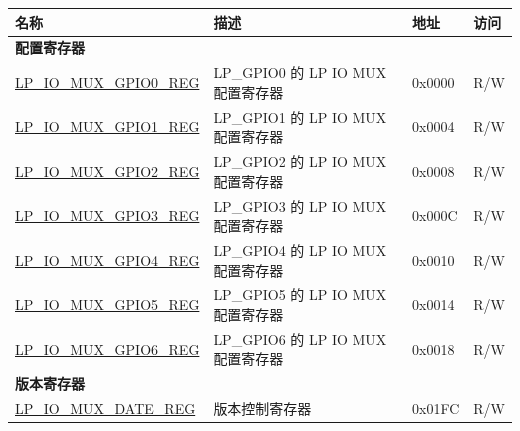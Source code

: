 \begin{longtable}{ | p{6cm} | p{7.2cm} | p{1.3cm} | p{1cm} | }
\hline\rowcolor{lightgray}
\textbf{名称} & \textbf{描述} &  \textbf{地址} & \textbf{访问} \\ \hline
\endhead
\multicolumn{4}{|l|}{\textbf{配置寄存器}} \\ \hline
\hyperref[regdesc:LPIOMUXGPIONREG]{LP\_IO\_MUX\_GPIO0\_REG} & LP\_GPIO0 的 LP IO MUX 配置寄存器 & 0x0000 & R/W \\ \hline
\hyperref[regdesc:LPIOMUXGPIONREG]{LP\_IO\_MUX\_GPIO1\_REG} & LP\_GPIO1 的 LP IO MUX 配置寄存器 & 0x0004 & R/W \\ \hline
\hyperref[regdesc:LPIOMUXGPIONREG]{LP\_IO\_MUX\_GPIO2\_REG} & LP\_GPIO2 的 LP IO MUX 配置寄存器 & 0x0008 & R/W \\ \hline
\hyperref[regdesc:LPIOMUXGPIONREG]{LP\_IO\_MUX\_GPIO3\_REG} & LP\_GPIO3 的 LP IO MUX 配置寄存器 & 0x000C & R/W \\ \hline
\hyperref[regdesc:LPIOMUXGPIONREG]{LP\_IO\_MUX\_GPIO4\_REG} & LP\_GPIO4 的 LP IO MUX 配置寄存器 & 0x0010 & R/W \\ \hline
\hyperref[regdesc:LPIOMUXGPIONREG]{LP\_IO\_MUX\_GPIO5\_REG} & LP\_GPIO5 的 LP IO MUX 配置寄存器 & 0x0014 & R/W \\ \hline
\hyperref[regdesc:LPIOMUXGPIONREG]{LP\_IO\_MUX\_GPIO6\_REG} & LP\_GPIO6 的 LP IO MUX 配置寄存器 & 0x0018 & R/W \\ \hline
\multicolumn{4}{|l|}{\textbf{版本寄存器}} \\ \hline
\hyperref[regdesc:LPIOMUXDATEREG]{LP\_IO\_MUX\_DATE\_REG} & 版本控制寄存器 & 0x01FC & R/W \\ \hline
\end{longtable}
